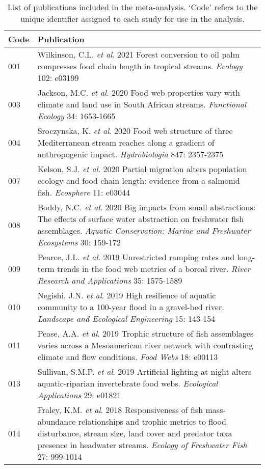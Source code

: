 \begingroup\small
\begin{longtable}{p{}p{}}
\caption{List of publications included in the meta-analysis.
             `Code' refers to the unique identifier assigned to each study for use in the analysis.} \\ 
  \hline
Code & Publication \\ 
  \hline
001 & Wilkinson, C.L. \textit{et al}. 2021 Forest conversion to oil palm compresses food chain length in tropical streams. \textit{Ecology} 102: e03199 \\ 
  003 & Jackson, M.C. \textit{et al}. 2020 Food web properties vary with climate and land use in South African streams. \textit{Functional Ecology} 34: 1653-1665 \\ 
  004 & Sroczynska, K. \textit{et al}. 2020 Food web structure of three Mediterranean stream reaches along a gradient of anthropogenic impact. \textit{Hydrobiologia} 847: 2357-2375 \\ 
  007 & Kelson, S.J. \textit{et al}. 2020 Partial migration alters population ecology and food chain length: evidence from a salmonid fish. \textit{Ecosphere} 11: e03044 \\ 
  008 & Boddy, N.C. \textit{et al}. 2020 Big impacts from small abstractions: The effects of surface water abstraction on freshwater fish assemblages. \textit{Aquatic Conservation: Marine and Freshwater Ecosystems} 30: 159-172 \\ 
  009 & Pearce, J.L. \textit{et al}. 2019 Unrestricted ramping rates and long-term trends in the food web metrics of a boreal river. \textit{River Research and Applications} 35: 1575-1589 \\ 
  010 & Negishi, J.N. \textit{et al}. 2019 High resilience of aquatic community to a 100-year flood in a gravel-bed river. \textit{Landscape and Ecological Engineering} 15: 143-154 \\ 
  011 & Pease, A.A. \textit{et al}. 2019 Trophic structure of fish assemblages varies across a Mesoamerican river network with contrasting climate and flow conditions. \textit{Food Webs} 18: e00113 \\ 
  013 & Sullivan, S.M.P. \textit{et al}. 2019 Artificial lighting at night alters aquatic-riparian invertebrate food webs. \textit{Ecological Applications} 29: e01821 \\ 
  014 & Fraley, K.M. \textit{et al}. 2018 Responsiveness of fish mass-abundance relationships and trophic metrics to flood disturbance, stream size, land cover and predator taxa presence in headwater streams. \textit{Ecology of Freshwater Fish} 27: 999-1014 \\ 

\end{longtable}
